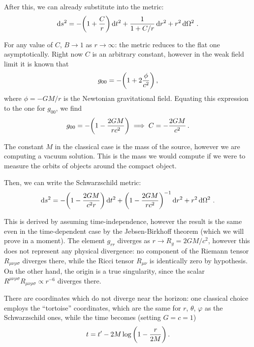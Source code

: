 \documentclass[main.tex]{subfiles}
\begin{document}
After this, we can already substitute into the metric: 
%
\begin{align}
\dd{s^2} = - \qty(1 + \frac{C}{r}) \dd{t^2} 
+ \frac{1}{1 + C/r} \dd{r^2} + r^2 \dd{\Omega^2}
\,.
\end{align}

For any value of \(C\), \(B \to 1\) as \(r \to \infty \): the metric reduces to the flat one asymptotically. 
Right now \(C\) is an arbitrary constant, however in the weak field limit it is known that 
%
\begin{align}
g_{00} = - \qty(1 + 2 \frac{\phi }{c^2})
\,,
\end{align}
%
where \(\phi = - GM / r\) is the Newtonian gravitational field.
Equating this expression to the one for \(g_{00} \), we find 
%
\begin{align}
g_{00} = - \qty(1 - \frac{2 GM}{rc^2})
\implies C = - \frac{2GM}{c^2}
\,.
\end{align}

The constant \(M\) in the classical case is the mass of the source, however we are computing a vacuum solution. This is the mass we would compute if we were to measure the orbits of objects around the compact object.


Then, we can write the Schwarzschild metric: 
%
\begin{align}
\dd{s^2} = - \qty(1 - \frac{2GM}{c^2r}) \dd{t^2}
+ \qty(1 - \frac{2GM}{rc^2})^{-1} \dd{r^2} + r^2 \dd{\Omega^2}
\,.
\end{align}

This is derived by assuming time-independence, however the result is the same even in the time-dependent case by the Jebsen-Birkhoff theorem (which we will prove in a moment). 
The element \(g_{rr} \) diverges as \(r \to R_g = 2GM/c^2\), however this does not represent any physical divergence: no component of the Riemann tensor \(R_{\mu \nu \rho \sigma }\) diverges there, while the Ricci tensor \(R_{\mu \nu }\) is identically zero by hypothesis.
On the other hand, the origin is a true singularity, since the scalar \(R^{\mu \nu \rho \sigma } R_{\mu \nu \rho \sigma } \propto r^{-6}\) diverges there. 

There are coordinates which do not diverge near the horizon: one classical choice employs the ``tortoise'' coordinates, which are the same for \(r\), \(\theta \), \(\varphi \) as the Schwarzschild ones, while the time becomes (setting \(G = c =  1\))
%
\begin{align}
t = t' - 2M \log \qty(1 - \frac{r}{2M})
\,.
\end{align}
\end{document}
